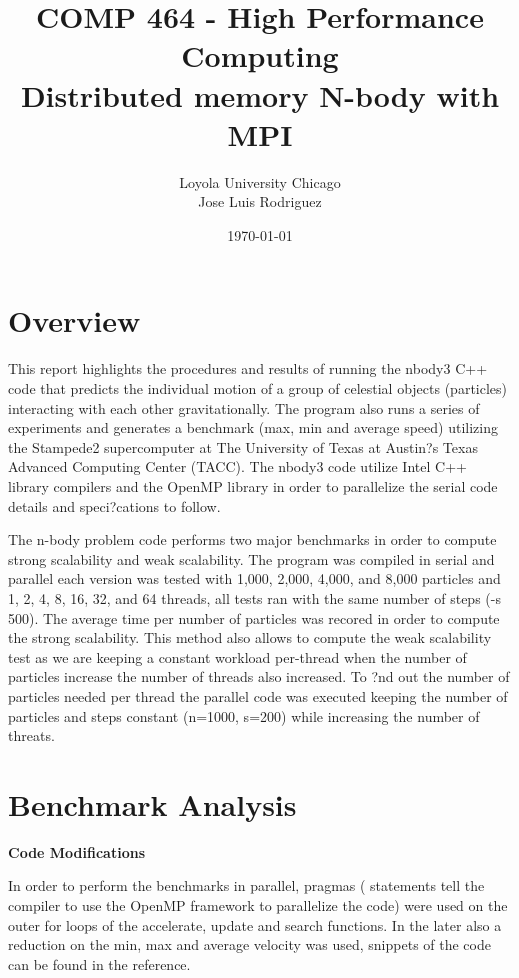 \documentclass[12pt]{article} %
\title{ COMP 464 - High Performance Computing \\ Distributed memory N-body with MPI} %
\author{
Loyola University Chicago \\
Jose Luis Rodriguez 
} %
\date{\today} %
\begin{document}
\maketitle

\thispagestyle{fancy}


\section{Overview}

This report highlights the procedures and results of running the nbody3 C++ code that predicts the individual motion of a group of celestial objects (particles) interacting with each other gravitationally. The program also runs a series of experiments and generates a benchmark (max, min and average speed) utilizing the Stampede2 supercomputer at The University of Texas at Austin?s Texas Advanced Computing Center (TACC). The nbody3 code utilize Intel C++ library compilers and the OpenMP library in order to parallelize the serial code details and speci?cations to follow.

The n-body problem code performs two major benchmarks in order to compute strong scalability and weak scalability. The program was compiled in serial and parallel each version was tested with 1,000, 2,000, 4,000, and 8,000 particles and 1, 2, 4, 8, 16, 32, and 64 threads, all tests ran with the same number of steps (-s 500). The average time per number of particles was recored in order to compute the strong scalability. This method also allows to compute the weak scalability test as we are keeping a constant workload per-thread when the number of particles increase the number of threads also increased. To ?nd out the number of particles needed per thread the parallel code was executed keeping the number of particles and steps constant (n=1000, s=200) while increasing the number of threats.

\section{Benchmark Analysis}

\textbf{Code Modifications} 

In order to perform the benchmarks in parallel, pragmas ( statements tell the compiler to use the OpenMP framework to parallelize the code) were used on the outer for loops of the accelerate, update and search functions. In the later also a reduction on the min, max and average velocity was used, snippets of the code can be found in the reference.
\end{document}
